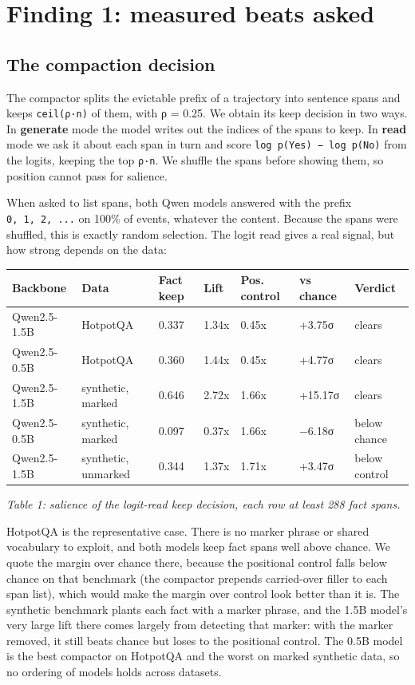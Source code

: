\documentclass[10pt]{article}
\begin{document}
\section{Finding 1: measured beats asked}

\subsection{The compaction decision}

The compactor splits the evictable prefix of a trajectory into sentence spans and keeps
\texttt{ceil(ρ·n)} of them, with ρ = 0.25. We obtain its keep decision in two ways. In \textbf{generate}
mode the model writes out the indices of the spans to keep. In \textbf{read} mode we ask it about
each span in turn and score \texttt{log\ p(Yes)\ −\ log\ p(No)} from the logits, keeping the top \texttt{ρ·n}.
We shuffle the spans before showing them, so position cannot pass for salience.

When asked to list spans, both Qwen models answered with the prefix \texttt{0,\ 1,\ 2,\ ...} on 100\%
of events, whatever the content. Because the spans were shuffled, this is exactly random
selection. The logit read gives a real signal, but how strong depends on the data:

\begin{longtable}[]{@{}lllllll@{}}
\toprule\noalign{}
Backbone & Data & Fact keep & Lift & Pos. control & vs chance & Verdict \\
\midrule\noalign{}
\endhead
\bottomrule\noalign{}
\endlastfoot
Qwen2.5-1.5B & HotpotQA & 0.337 & 1.34x & 0.45x & +3.75σ & clears \\
Qwen2.5-0.5B & HotpotQA & 0.360 & 1.44x & 0.45x & +4.77σ & clears \\
Qwen2.5-1.5B & synthetic, marked & 0.646 & 2.72x & 1.66x & +15.17σ & clears \\
Qwen2.5-0.5B & synthetic, marked & 0.097 & 0.37x & 1.66x & −6.18σ & below chance \\
Qwen2.5-1.5B & synthetic, unmarked & 0.344 & 1.37x & 1.71x & +3.47σ & below control \\
\end{longtable}

\emph{Table 1: salience of the logit-read keep decision, each row at least 288 fact spans.}

HotpotQA is the representative case. There is no marker phrase or shared vocabulary to
exploit, and both models keep fact spans well above chance. We quote the margin over chance
there, because the positional control falls below chance on that benchmark (the compactor
prepends carried-over filler to each span list), which would make the margin over control
look better than it is. The synthetic benchmark plants each fact with a marker phrase, and
the 1.5B model's very large lift there comes largely from detecting that marker: with the
marker removed, it still beats chance but loses to the positional control. The 0.5B model is
the best compactor on HotpotQA and the worst on marked synthetic data, so no ordering of
models holds across datasets.
\end{document}
